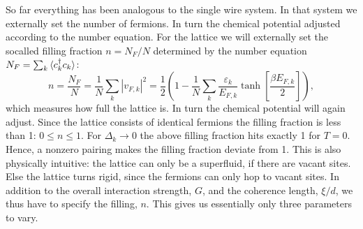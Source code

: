 So far everything has been analogous to the single wire system. In that system we externally set the number of fermions. In turn the chemical potential adjusted according to the number equation. For the lattice we will externally set the socalled filling fraction $n = N_F / N$ determined by the number equation $N_F = \sum_k \braket{c^\dagger_k c_k}$:
\begin{equation}
n = \frac{N_F}{N} = \frac{1}{N}\sum_k |v_{F,k}|^2 = \frac{1}{2}\left(1 - \frac{1}{N}\sum_k \frac{\varepsilon_k}{E_{F,k}}\tanh\left[\frac{\beta E_{F,k}}{2} \right] \right), 
\label{eq.fillingfraction.lattice}
\end{equation}
which measures how full the lattice is. In turn the chemical potential will again adjust. Since the lattice consists of identical fermions the filling fraction is less than 1: $0 \leq n \leq 1$. For $\Delta_k \to 0$ the above filling fraction hits exactly 1 for $T = 0$. Hence, a nonzero pairing makes the filling fraction deviate from 1. This is also physically intuitive: the lattice can only be a superfluid, if there are vacant sites. Else the lattice turns rigid, since the fermions can only hop to vacant sites. In addition to the overall interaction strength, $G$, and the coherence length, $\xi / d$, we thus have to specify the filling, $n$. This gives us essentially only three parameters to vary. 

